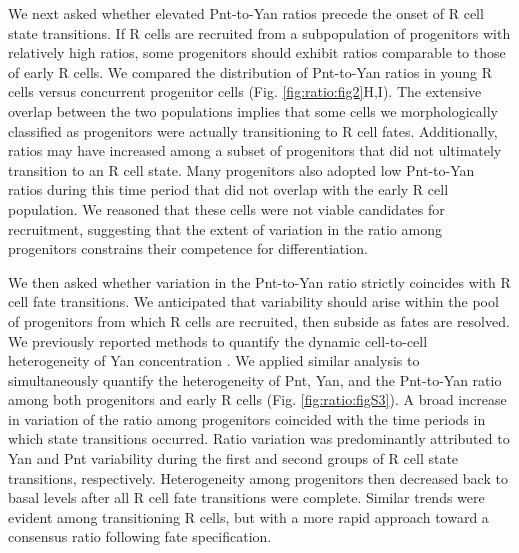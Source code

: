 We next asked whether elevated Pnt-to-Yan ratios precede the onset of R cell state transitions. If R cells are recruited from a subpopulation of progenitors with relatively high ratios, some progenitors should exhibit ratios comparable to those of early R cells. We compared the distribution of Pnt-to-Yan ratios in young R cells versus concurrent progenitor cells (Fig. \ref{fig:ratio:fig2}H,I). The extensive overlap between the two populations implies that some cells we morphologically classified as progenitors were actually transitioning to R cell fates. Additionally, ratios may have increased among a subset of progenitors that did not ultimately transition to an R cell state. Many progenitors also adopted low Pnt-to-Yan ratios during this time period that did not overlap with the early R cell population. We reasoned that these cells were not viable candidates for recruitment, suggesting that the extent of variation in the ratio among progenitors constrains their competence for differentiation.

We then asked whether variation in the Pnt-to-Yan ratio strictly coincides with R cell fate transitions. We anticipated that variability should arise within the pool of progenitors from which R cells are recruited, then subside as fates are resolved. We previously reported methods to quantify the dynamic cell-to-cell heterogeneity of Yan concentration \cite{Pelaez2015a}. We applied similar analysis to simultaneously quantify the heterogeneity of Pnt, Yan, and the Pnt-to-Yan ratio among both progenitors and early R cells (Fig. \ref{fig:ratio:figS3}). A broad increase in variation of the ratio among progenitors coincided with the time periods in which state transitions occurred. Ratio variation was predominantly attributed to Yan and Pnt variability during the first and second groups of R cell state transitions, respectively. Heterogeneity among progenitors then decreased back to basal levels after all R cell fate transitions were complete. Similar trends were evident among transitioning R cells, but with a more rapid approach toward a consensus ratio following fate specification.

